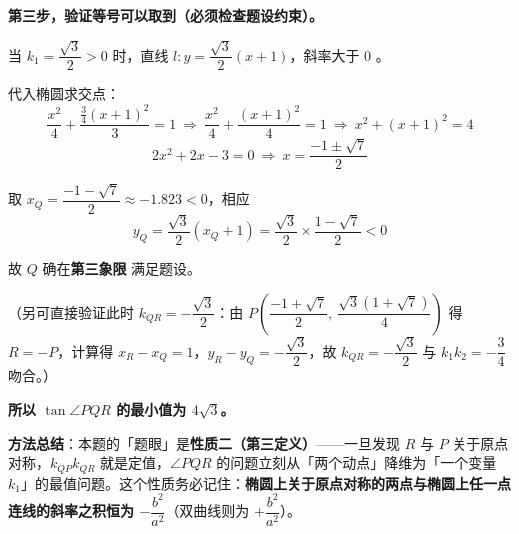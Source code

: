 \begin{answer}
\textbf{第三步，验证等号可以取到（必须检查题设约束）。}

当 $k_1=\dfrac{\sqrt3}{2}>0$ 时，直线 $l:y=\dfrac{\sqrt3}{2}(x+1)$，斜率大于 $0$ 。

代入椭圆求交点：
\nopagebreak[4]
\[\frac{x^2}{4}+\frac{\frac34(x+1)^2}{3}=1\ \Longrightarrow\ \frac{x^2}{4}+\frac{(x+1)^2}{4}=1\ \Longrightarrow\ x^2+(x+1)^2=4\]
\nopagebreak[4]
\[2x^2+2x-3=0\ \Longrightarrow\ x=\frac{-1\pm\sqrt7}{2}\]

取 $x_Q=\dfrac{-1-\sqrt7}{2}\approx-1.823<0$，相应
\nopagebreak[4]
\[y_Q=\frac{\sqrt3}{2}\left(x_Q+1\right)=\frac{\sqrt3}{2}\times\frac{1-\sqrt7}{2}<0\]

故 $Q$ 确在\textbf{第三象限}  满足题设。

（另可直接验证此时 $k_{QR}=-\dfrac{\sqrt3}{2}$：由 $P\left(\dfrac{-1+\sqrt7}{2},\ \dfrac{\sqrt3(1+\sqrt7)}{4}\right)$ 得 $R=-P$，计算得 $x_R-x_Q=1$，$y_R-y_Q=-\dfrac{\sqrt3}{2}$，故 $k_{QR}=-\dfrac{\sqrt3}{2}$  与 $k_1k_2=-\dfrac34$ 吻合。）

\textbf{所以 $\tan\angle PQR$ 的最小值为 $4\sqrt3$。}

\begin{gktip}
\textbf{方法总结}：本题的「题眼」是\textbf{性质二（第三定义）}——一旦发现 $R$ 与 $P$ 关于原点对称，$k_{QP}k_{QR}$ 就是定值，$\angle PQR$ 的问题立刻从「两个动点」降维为「一个变量 $k_1$」的最值问题。这个性质务必记住：\textbf{椭圆上关于原点对称的两点与椭圆上任一点连线的斜率之积恒为 $-\dfrac{b^2}{a^2}$}（双曲线则为 $+\dfrac{b^2}{a^2}$）。
\end{gktip}



\par\medskip

\end{answer}
